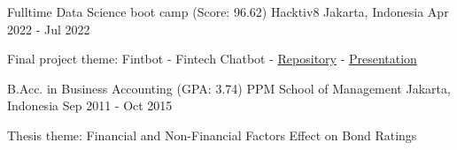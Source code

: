 

\begin{cventries}

  \cventry
    {Fulltime Data Science boot camp (Score: 96.62)} %
    {Hacktiv8} %
    {Jakarta, Indonesia} %
    {Apr 2022 - Jul 2022} %
    {
      \begin{cvitems} %
        \item {Final project theme: Fintbot - Fintech Chatbot - \href{https://github.com/H8-Assignments-Bay/p2---final-project-group-003}{Repository} - \href{https://www.youtube.com/watch?v=3QJtzI4h6No}{Presentation}}
      \end{cvitems}
    }

  \cventry
    {B.Acc. in Business Accounting (GPA: 3.74)} %
    {PPM School of Management} %
    {Jakarta, Indonesia} %
    {Sep 2011 - Oct 2015} %
    {
      \begin{cvitems} %
        \item {Thesis theme: Financial and Non-Financial Factors Effect on Bond Ratings}
      \end{cvitems}
    }

\end{cventries}
